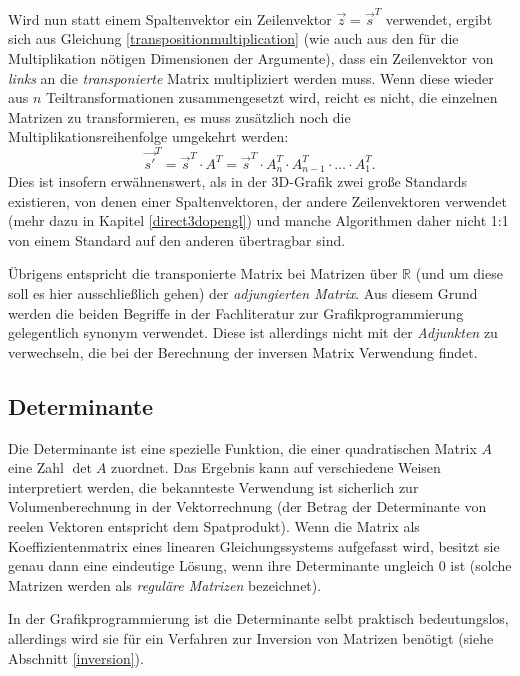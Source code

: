 Wird nun statt einem Spaltenvektor ein Zeilenvektor $\vec z = \vec{s}^T$ verwendet, ergibt sich aus Gleichung \ref{transpositionmultiplication} (wie auch aus den für die Multiplikation nötigen Dimensionen der Argumente), dass ein Zeilenvektor von \emph{links} an die \emph{transponierte} Matrix multipliziert werden muss. Wenn diese wieder aus $n$ Teiltransformationen zusammengesetzt wird, reicht es nicht, die einzelnen Matrizen zu transformieren, es muss zusätzlich noch die Multiplikationsreihenfolge umgekehrt werden:
\begin{equation}
 \vec{s'}^T = \vec{s}^T \cdot A^T = \vec{s}^T \cdot A_n^T \cdot A_{n-1}^T \cdot \ldots \cdot A_1^T.
\end{equation}
Dies ist insofern erwähnenswert, als in der 3D-Grafik zwei große Standards existieren, von denen einer Spaltenvektoren, der andere Zeilenvektoren verwendet (mehr dazu in Kapitel  	\ref{direct3dopengl}) und manche Algorithmen daher nicht 1:1 von einem Standard auf den anderen übertragbar sind.

Übrigens entspricht die transponierte Matrix bei Matrizen über $\mathbb R$ (und um diese soll es hier ausschließlich gehen) der \emph{adjungierten Matrix}. Aus diesem Grund werden die beiden Begriffe in der Fachliteratur zur Grafikprogrammierung gelegentlich synonym verwendet. Diese ist allerdings nicht mit der \emph{Adjunkten} zu verwechseln, die bei der Berechnung der inversen Matrix Verwendung findet.

\subsection{Determinante}
Die Determinante ist eine spezielle Funktion, die einer quadratischen Matrix $A$ eine Zahl $\det A$ zuordnet. Das Ergebnis kann auf verschiedene Weisen interpretiert werden, die bekannteste Verwendung ist sicherlich zur Volumenberechnung in der Vektorrechnung (der Betrag der Determinante von reelen Vektoren entspricht dem Spatprodukt). Wenn die Matrix als Koeffizientenmatrix eines linearen Gleichungssystems aufgefasst wird, besitzt sie genau dann eine eindeutige Lösung, wenn ihre Determinante ungleich 0 ist (solche Matrizen werden als \emph{reguläre Matrizen} bezeichnet).

In der Grafikprogrammierung ist die Determinante selbt praktisch bedeutungslos, allerdings wird sie für ein Verfahren zur Inversion von Matrizen benötigt (siehe Abschnitt \ref{inversion}).

